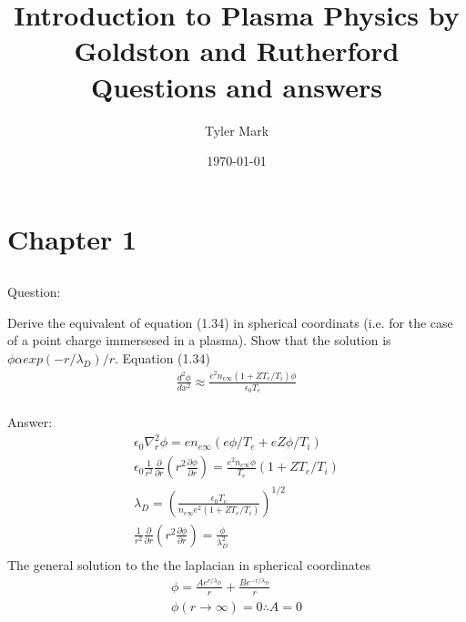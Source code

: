 \documentclass{article}
\author{Tyler Mark}
\newcommand{\partialrn}{\frac{\partial}{\partial r}}
\newcommand{\partialr}[1]{\frac{\partial #1}{\partial r}}
\begin{document}
\title{Introduction to Plasma Physics by Goldston and Rutherford Questions and answers}

\pagestyle{fancy}
\date{\today}
\maketitle
\newpage

\tableofcontents
\newpage
\section{Chapter 1}
\subsection{}
\subsection{}
\subsection{}

Question:

Derive the equivalent of equation (1.34) in spherical coordinats (i.e. for the case of a point charge immersesed in a plasma). Show that the solution is $\phi \alpha exp(-r/\lambda_D)/r$.
Equation (1.34)
\begin{eqnarray*}
    \frac{d^2\phi}{dx^2}\approx \frac{e^2n_{e\infty}(1+ZT_e/T_i)\phi}{\epsilon_0T_e}\\
\end{eqnarray*}

Answer:
\begin{eqnarray*}
    \epsilon_0\nabla^2_r\phi=en_{e\infty}(e\phi/T_e+eZ\phi/T_i)\\
    \epsilon_0\frac{1}{r^2}\partialrn(r^2\partialr{\phi})=\frac{e^2n_{e\infty}\phi}{T_e}(1+ZT_e/T_i)\\
    \lambda_D=(\frac{\epsilon_0 T_e}{n_{e\infty}e^2(1+ZT_e/T_i)})^{1/2}\\
    \frac{1}{r^2}\partialrn(r^2\partialr{\phi})=\frac{\phi}{\lambda_D^2}\\
\end{eqnarray*}
The general solution to the the laplacian in spherical coordinates
\begin{eqnarray*}
    \phi=\frac{Ae^{r/\lambda_D}}{r}+\frac{Be^{-r/\lambda_D}}{r}\\
    \phi(r\rightarrow \infty)=0 \therefore A=0\\
\end{eqnarray*}
\end{document}
